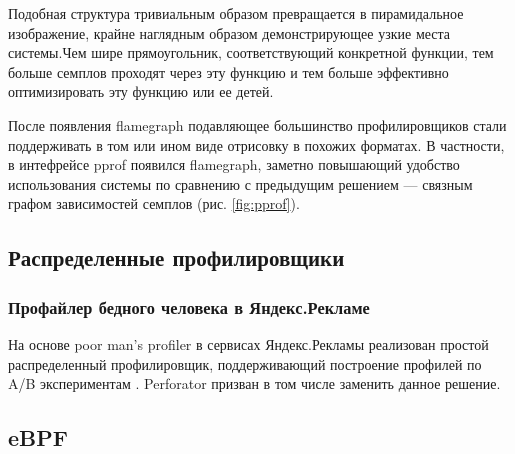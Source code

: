 Подобная структура тривиальным образом превращается в пирамидальное изображение, крайне наглядным образом демонстрирующее узкие места системы.Чем шире прямоугольник, соответствующий конкретной функции, тем больше семплов проходят через эту функцию и тем больше эффективно
оптимизировать эту функцию или ее детей.

После появления flamegraph подавляющее большинство профилировщиков стали поддерживать в том или ином виде отрисовку в похожих форматах.
В частности, в интефрейсе pprof появился flamegraph, заметно повышающий удобство использования системы по сравнению с предыдущим решением ---
связным графом зависимостей семплов (рис. \ref{fig:pprof}).

\subsection{Распределенные профилировщики}


\subsubsection{Профайлер бедного человека в Яндекс.Рекламе}
На основе poor man's profiler в сервисах Яндекс.Рекламы реализован простой распределенный профилировщик, поддерживающий
построение профилей по A/B экспериментам \cite{pmp:yabs}.
Perforator призван в том числе заменить данное решение.





\subsection{eBPF}
